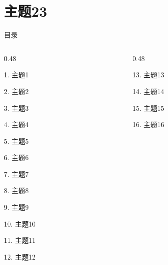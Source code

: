 \documentclass[aspectratio=169,10pt,fontset=fandol]{ctexbeamer}
\begin{document}
\section{主题23}
\begin{frame}[t,fragile]{目录}
\small
\begin{columns}[T,onlytextwidth]
\begin{column}{0.48\textwidth}
{\color{black}\small 1. 主题1\par}\vspace{0.22em}
{\color{black}\small 2. 主题2\par}\vspace{0.22em}
{\color{black}\small 3. 主题3\par}\vspace{0.22em}
{\color{black}\small 4. 主题4\par}\vspace{0.22em}
{\color{black}\small 5. 主题5\par}\vspace{0.22em}
{\color{black}\small 6. 主题6\par}\vspace{0.22em}
{\color{black}\small 7. 主题7\par}\vspace{0.22em}
{\color{black}\small 8. 主题8\par}\vspace{0.22em}
{\color{black}\small 9. 主题9\par}\vspace{0.22em}
{\color{black}\small 10. 主题10\par}\vspace{0.22em}
{\color{black}\small 11. 主题11\par}\vspace{0.22em}
{\color{black}\small 12. 主题12\par}\vspace{0.22em}
\end{column}
\begin{column}{0.48\textwidth}
{\color{black}\small 13. 主题13\par}\vspace{0.22em}
{\color{black}\small 14. 主题14\par}\vspace{0.22em}
{\color{black}\small 15. 主题15\par}\vspace{0.22em}
{\color{black}\small 16. 主题16\par}\vspace{0.22em}

\end{column}
\end{columns}
\end{frame}
\end{document}
